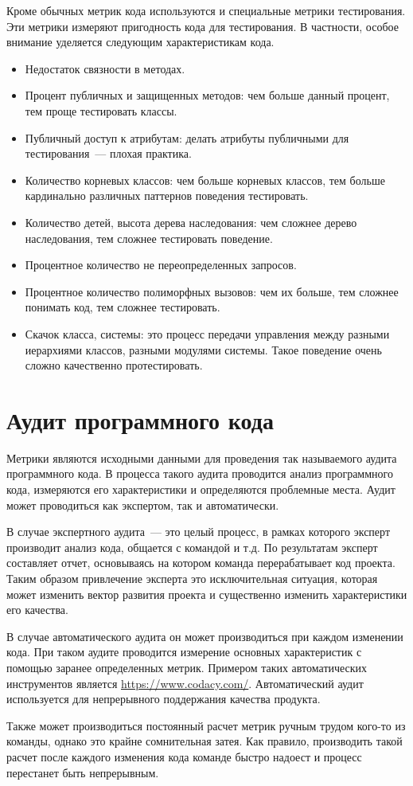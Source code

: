 \documentclass{../../text-style}
\begin{document}
Кроме обычных метрик кода используются и специальные метрики тестирования. Эти метрики измеряют пригодность кода для тестирования. В частности, особое внимание уделяется следующим характеристикам кода.

\begin{itemize}
    \item Недостаток связности в методах.
    \item Процент публичных и защищенных методов: чем больше данный процент, тем проще тестировать классы.
    \item Публичный доступ к атрибутам: делать атрибуты публичными для тестирования~--- плохая практика.
    \item Количество корневых классов: чем больше корневых классов, тем больше кардинально различных паттернов поведения тестировать.
    \item Количество детей, высота дерева наследования: чем сложнее дерево наследования, тем сложнее тестировать поведение.
    \item Процентное количество не переопределенных запросов. 
    \item Процентное количество полиморфных вызовов: чем их больше, тем сложнее понимать код, тем сложнее тестировать.
    \item Скачок класса, системы: это процесс передачи управления между разными иерархиями классов, разными модулями системы. Такое поведение очень сложно качественно протестировать.
\end{itemize}

\section{Аудит программного кода}

Метрики являются исходными данными для проведения так называемого аудита программного кода. В процесса такого аудита проводится анализ программного кода, измеряются его характеристики и определяются проблемные места. Аудит может проводиться как экспертом, так и автоматически.

В случае экспертного аудита~--- это целый процесс, в рамках которого эксперт производит анализ кода, общается с командой и т.д. По результатам эксперт составляет отчет, основываясь на котором команда перерабатывает код проекта. Таким образом привлечение эксперта это исключительная ситуация, которая может изменить вектор развития проекта и существенно изменить характеристики его качества.

В случае автоматического аудита он может производиться при каждом изменении кода. При таком аудите проводится измерение основных характеристик с помощью заранее определенных метрик. Примером таких автоматических инструментов является \url{https://www.codacy.com/}. Автоматический аудит используется для непрерывного поддержания качества продукта.

Также может производиться постоянный расчет метрик ручным трудом кого-то из команды, однако это крайне сомнительная затея. Как правило, производить такой расчет после каждого изменения кода команде быстро надоест и процесс перестанет быть непрерывным.
\end{document}

